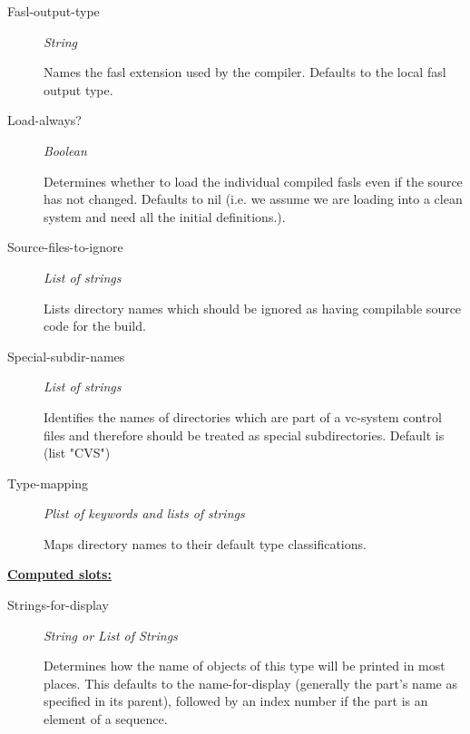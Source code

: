 \documentclass [11pt]{book}
\begin{document}
\begin{itemize}
\begin{description}
\item [Fasl-output-type]
\emph{String}

 Names the fasl extension used by the compiler. Defaults to the local fasl output type.




\item [Load-always?]
\emph{Boolean}

 Determines whether to load the individual compiled fasls even if the source has not changed.
Defaults to nil (i.e. we assume we are loading into a clean system and need all the initial definitions.).




\item [Source-files-to-ignore]
\emph{List of strings}

 Lists directory names which should be ignored as having
compilable source code for the build.




\item [Special-subdir-names]
\emph{List of strings}

 Identifies the names of directories which are part of a vc-system control files
and therefore should be treated as special subdirectories.
Default is (list "CVS")




\item [Type-mapping]
\emph{Plist of keywords and lists of strings}

 Maps directory names to their default type classifications.




\end{description}






\textbf{
\underline{Computed slots:}}

\begin{description}

\item [Strings-for-display]
\emph{String or List of Strings}

 Determines how the name of objects of
this type will be printed in most places.  This defaults to the
name-for-display (generally the part's name as specified in its
parent), followed by an index number if the part is an element of a
sequence.




\end{description}







\end{itemize}
\end{document}
